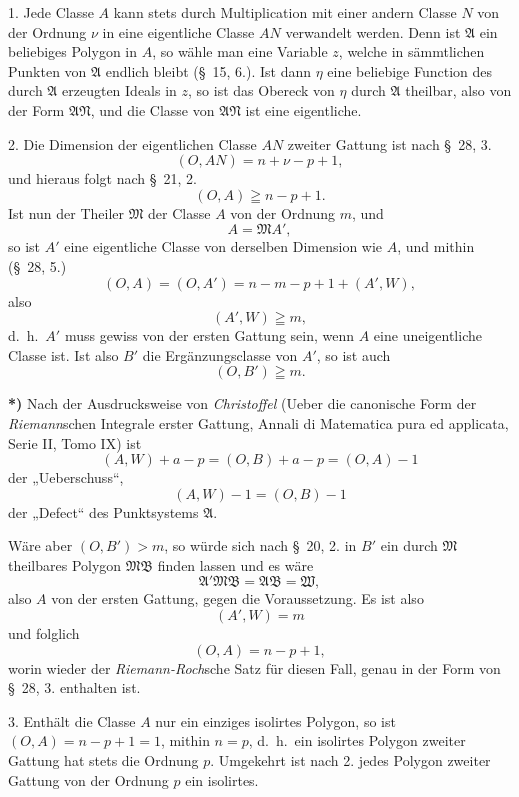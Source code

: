 \documentclass{article}
\begin{document}
1. Jede Classe $A$ kann stets durch Multiplication mit einer andern Classe $N$ von der Ordnung $\nu$ in eine eigentliche Classe $AN$ verwandelt werden. Denn ist $\mathfrak{A}$ ein beliebiges Polygon in $A$, so wähle man eine Variable $z$, welche in sämmtlichen Punkten von $\mathfrak{A}$ endlich bleibt (§~15, 6.). Ist dann $\eta$ eine beliebige Function des durch $\mathfrak{A}$ erzeugten Ideals in $z$, so ist das Obereck von $\eta$ durch $\mathfrak{A}$ theilbar, also von der Form $\mathfrak{A}\mathfrak{N}$, und die Classe von $\mathfrak{A}\mathfrak{N}$ ist eine eigentliche.

2. Die Dimension der eigentlichen Classe $AN$ zweiter Gattung ist nach §~28, 3.
\[ (O, AN) = n+\nu-p+1, \]
und hieraus folgt nach §~21, 2.
\[ (O, A) \geqq n-p+1. \]
Ist nun der Theiler $\mathfrak{M}$ der Classe $A$ von der Ordnung $m$, und
\[ A = \mathfrak{M}A', \]
so ist $A'$ eine eigentliche Classe von derselben Dimension wie $A$, und mithin (§~28, 5.)
\[ (O, A) = (O, A') = n-m-p+1+(A', W), \]
also
\[ (A', W) \geqq m, \]
d.\ h.\ $A'$ muss gewiss von der ersten Gattung sein, wenn $A$ eine uneigentliche Classe ist. Ist also $B'$ die Ergänzungsclasse von $A'$, so ist auch
\[ (O, B') \geqq m. \]

\textbf{*)} Nach der Ausdrucksweise von \emph{Christoffel} (Ueber die canonische Form der \emph{Riemann}schen Integrale erster Gattung, Annali di Matematica pura ed applicata, Serie II, Tomo IX) ist
\[ (A, W)+a-p = (O, B)+a-p = (O, A)-1 \]
der „Ueberschuss“,
\[ (A, W)-1 = (O, B)-1 \]
der „Defect“ des Punktsystems $\mathfrak{A}$.

Wäre aber $(O, B') > m$, so würde sich nach §~20, 2. in $B'$ ein durch $\mathfrak{M}$ theilbares Polygon $\mathfrak{M}\mathfrak{B}$ finden lassen und es wäre
\[ \mathfrak{A}'\mathfrak{M}\mathfrak{B} = \mathfrak{A}\mathfrak{B} = \mathfrak{W}, \]
also $A$ von der ersten Gattung, gegen die Voraussetzung. Es ist also
\[ (A', W) = m \]
und folglich
\[ (O, A) = n-p+1, \]
worin wieder der \emph{Riemann-Roch}sche Satz für diesen Fall, genau in der Form von §~28, 3. enthalten ist.

3. Enthält die Classe $A$ nur ein einziges isolirtes Polygon, so ist $(O, A) = n-p+1 = 1$, mithin $n = p$, d.\ h.\ ein isolirtes Polygon zweiter Gattung hat stets die Ordnung $p$. Umgekehrt ist nach 2. jedes Polygon zweiter Gattung von der Ordnung $p$ ein isolirtes.
\end{document}

